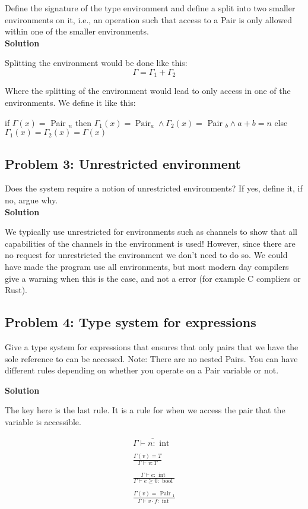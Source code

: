 Define the signature of the type environment and define a split into two smaller
environments on it, i.e., an operation such that access to a Pair is only allowed within one of
the smaller environments.\\

\textbf{Solution}

Splitting the environment would be done like this: 
\[
\Gamma = \Gamma_1 + \Gamma_2
\]

Where the splitting of the environment would lead to only access in one of the environments. We define it like this:

if $\Gamma(x)=$ Pair $_n$ then $\Gamma_1(x)=\operatorname{Pair}_a \wedge \Gamma_2(x)=$ Pair $_b \wedge a+b=n$ else $\Gamma_1(x)=\Gamma_2(x)=\Gamma(x)$

\subsection{Problem 3: Unrestricted environment}

Does the system require a notion of unrestricted environments? If yes, define it, if
no, argue why. \\

\textbf{Solution}

We typically use unrestricted for environments such as channels to show that all capabilities of the channels in the environment is used!
However, since there are no request for unrestricted the environment we don't need to do so. 
We could have made the program use all environments, but most modern day compilers give a warning when this is the case, and not a error (for example C compliers or Rust).


\subsection{Problem 4: Type system for expressions}

Give a type system for expressions that ensures that only pairs that we have the
sole reference to can be accessed. Note: There are no nested Pairs. You can have different rules depending on whether you
operate on a Pair variable or not.

\textbf{Solution}

The key here is the last rule. It is a rule for when we access the pair that the variable is accessible. 

\begin{equation}
    \begin{gathered}
    \overline{\Gamma \vdash n: \text { int }} \\ \\
    \frac{\Gamma(v)=T}{\Gamma \vdash v: T} \\ \\
    \frac{\Gamma \vdash e: \text { int }}{\Gamma \vdash e \geq 0: \text { bool }} \\ \\
    \frac{\Gamma(v)=\text { Pair }_1}{\Gamma \vdash v \cdot f: \text { int }}
    \end{gathered}
\end{equation}

